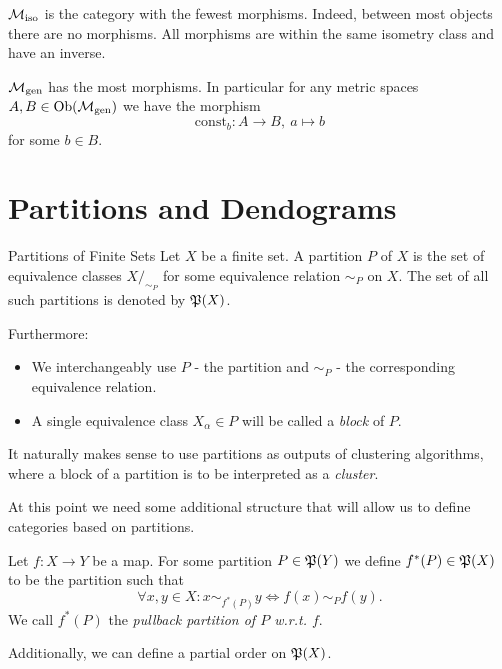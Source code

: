 \begin{myremark}{}{}
$\iso$ is the category with the fewest morphisms. Indeed, between most objects there are no morphisms.
All morphisms are within the same isometry class and have an inverse.\par
\medskip
$\gen$ has the most morphisms. In particular for any metric spaces $A,B \in \ob(\gen)$ we have the morphism
$$
\mathrm{const}_b: A \to B, \ a \mapsto b
$$
for some $b \in B$.
\end{myremark}

\section{Partitions and Dendograms}
\label{section__partitions}

\begin{definition}{Partitions of Finite Sets}{}
Let $X$ be a finite set. A partition $P$ of $X$ is the set of equivalence classes $X/_{\sim_P}$ for some equivalence relation $\sim_P$ on $X$. The set of all such partitions is denoted by $\P(X)$.\par

\medskip Furthermore:
\begin{itemize}
    \item We interchangeably use $P$ - the partition and $\sim_P$ - the corresponding equivalence relation.
    \item A single equivalence class $X_\alpha \in P$ will be called a \emph{block} of $P$.
\end{itemize}
\end{definition}

It naturally makes sense to use partitions as outputs of clustering algorithms, where a block of a partition is to be interpreted as a \emph{cluster}.

At this point we need some additional structure that will allow us to define categories based on partitions.

\begin{definition}{}{}
Let $f: X \to Y$ be a map. For some partition $P \in \P(Y)$ we define $f^*(P) \in \P(X)$ to be the partition such that
\begin{equation*}
    \forall x,y \in X: x \sim_{f^*(P)} y \iff f(x) \sim_P f(y).
\end{equation*}
We call $f^*(P)$ the \emph{pullback partition of $P$ w.r.t. $f$}.
\end{definition}

Additionally, we can define a partial order on $\P(X)$.

